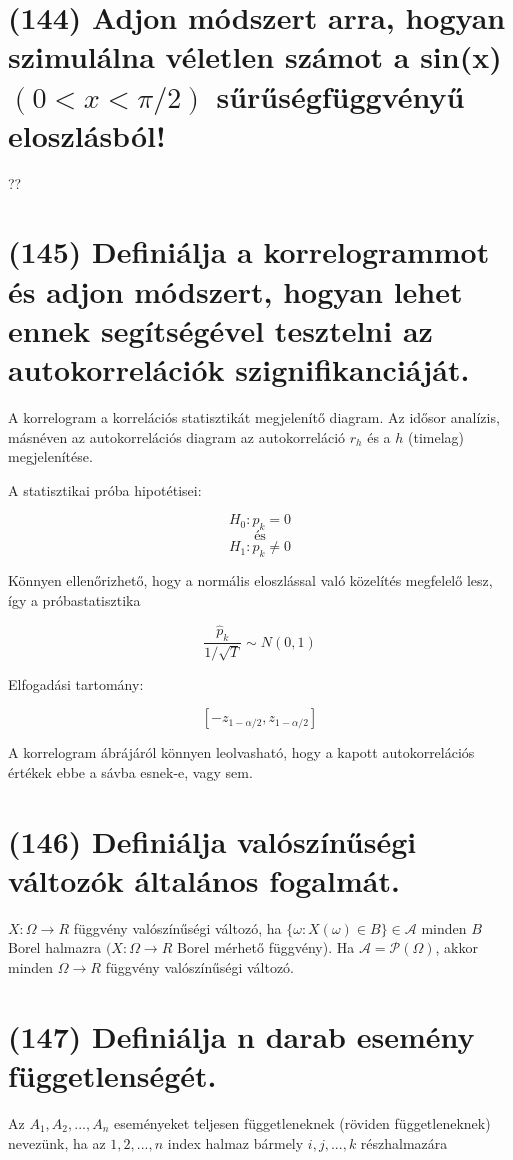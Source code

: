 \documentclass[12p]{article}
\begin{document}
\section{(144) Adjon módszert arra, hogyan szimulálna véletlen számot a sin(x) $(0 < x < \pi/2)$ sűrűségfüggvényű eloszlásból!}

??

\section{(145) Definiálja a korrelogrammot és adjon módszert, hogyan lehet ennek segítségével tesztelni
az autokorrelációk szignifikanciáját.}

A korrelogram a korrelációs statisztikát megjelenítő diagram. Az idősor analízis, másnéven az autokorrelációs diagram az autokorreláció $r_h$ és a $h$ (timelag) megjelenítése.

A statisztikai próba hipotétisei:

$$H_0 : p_k = 0$$
\[
	\text{és}
\]
$$H_1 : p_k \neq 0$$

Könnyen ellenőrizhető, hogy a normális eloszlással való közelítés megfelelő
lesz, így a próbastatisztika

$$\frac{\hat{p}_k}{1/\sqrt{T}} \sim N(0,1) $$

Elfogadási tartomány:

$$[-z_{1-\alpha/2},z_{1-\alpha/2}]$$

A korrelogram ábrájáról könnyen leolvasható, hogy a kapott autokorrelációs
értékek ebbe a sávba esnek-e, vagy sem.

\section{(146) Definiálja valószínűségi változók általános fogalmát.}

$X : \Omega \rightarrow R$ függvény valószínűségi változó, ha $\{\omega: X(\omega) \in B\} \in \mathscr{A}$ minden $B$ Borel halmazra $(X: \Omega \rightarrow R$ Borel mérhető függvény).
Ha $\mathscr{A} = \mathscr{P}(\Omega)$, akkor minden $\Omega \rightarrow R$ függvény valószínűségi változó.


\section{(147) Definiálja n darab esemény függetlenségét.}

Az $A_1,A_2, ..., A_n$ eseményeket teljesen függetleneknek (röviden függetleneknek) nevezünk, ha az ${1, 2, ..., n}$ index halmaz bármely ${i, j, ..., k}$ részhalmazára
\end{document}
